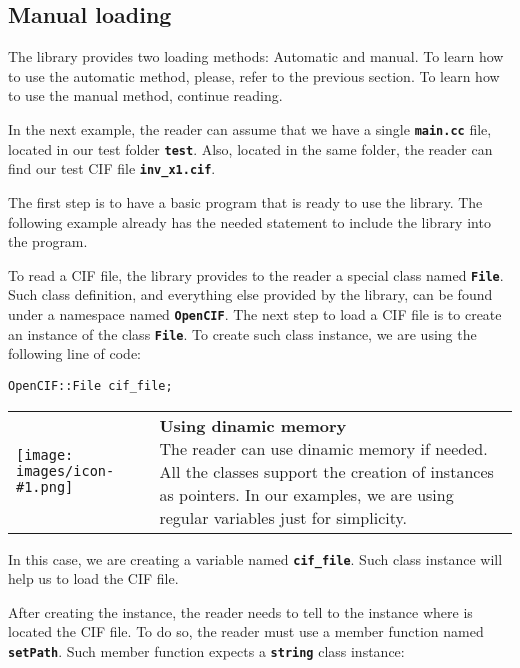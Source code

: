 \documentclass[11pt,twoside,openany,x11names,svgnames]{memoir}
\makeatletter
\newcommand{\IconNote}[3]
{
	\begin{table}[ht]
	\begin{tabular}{ lm{\dimexpr\textwidth-8\tabcolsep-\wd0}@{}}
		\toprule
		\texttt{[image: images/icon-\#1.png]}
		&
		\parbox[t]{155mm}{
		\textbf{#2} \\
		#3
		}
	\end{tabular}
\end{table}
}
\makeatother
\begin{document}
\subsection{Manual loading}\label{Manual-loading}

The library provides two loading methods: Automatic and manual. To learn how to use the automatic method, please, refer to the previous section. To learn how to use the manual method, continue reading.

In the next example, the reader can assume that we have a single \textbf{\texttt{main.cc}} file, located in our test folder \textbf{\texttt{test}}. Also, located in the same folder, the reader can find our test CIF file \textbf{\texttt{inv\_x1.cif}}.

The first step is to have a basic program that is ready to use the library. The following example already has the needed statement to include the library into the program.



To read a CIF file, the library provides to the reader a special class named \textbf{\texttt{File}}. Such class definition, and everything else provided by the library, can be found under a namespace named \textbf{\texttt{OpenCIF}}. The next step to load a CIF file is to create an instance of the class \textbf{\texttt{File}}. To create such class instance, we are using the following line of code:

\begin{lstlisting}[frame=single,style=CPPStyle]
OpenCIF::File cif_file;
\end{lstlisting}

\IconNote
	{info}
	{Using dinamic memory}
	{The reader can use dinamic memory if needed. All the classes support the creation of instances as pointers. In our examples, we are using regular variables just for simplicity.}

In this case, we are creating a variable named \textbf{\texttt{cif\_file}}. Such class instance will help us to load the CIF file.

After creating the instance, the reader needs to tell to the instance where is located the CIF file. To do so, the reader must use a member function named \textbf{\texttt{setPath}}. Such member function expects a \textbf{\texttt{string}} class instance:
\end{document}
